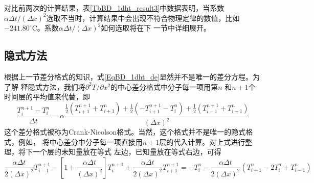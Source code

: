 对比前两次的计算结果，表\ref{TbBD_1dht_result3}中数据表明，当系数$\alpha\Delta t/(\Delta
x)^{2}$选取不当时，计算结果中会出现不符合物理定律的数值，比如
$-241.80^{\circ}\!\mathrm{C}$。系数$\alpha\Delta t/(\Delta x)^{2}$如何选取将在下
一节中详细展开。

\subsection{隐式方法}
根据上一节差分格式的知识，式\eqref{EqBD_1dht_de}显然并不是唯一的差分方程。为了解
释隐式方法，我们将$\partial^{2}T/\partial x^{2}$的中心差分格式中分子每一项用第$n$
和$n+1$个时间层的平均值来代替，即
\begin{equation}
  \frac{T_{i}^{n+1}-T_{i}^{n}}{\Delta t}
  =
  \alpha
  \frac{
    \frac{1}{2}(T_{i+1}^{n+1}+T_{i+1}^{n}) +
    \frac{1}{2}(-T_{i+1}^{n+1}-T_{i}^{n}) +
    \frac{1}{2}(T_{i-1}^{n+1}+T_{i-1}^{n}) 
  }{(\Delta x)^{2}}
\end{equation}
这个差分格式被称为Crank-Nicolson格式。当然，这个格式并不是唯一的隐式格式，例如，
将中心差分中分子每一项直接用$n+1$层的代入计算。对上式进行整理，将下一个层的未知量放在等式
左边，已知量放在等式右边，可得
\begin{equation}
  \frac{\alpha\Delta t}{2(\Delta x)^{2}}
  T_{i-1}^{n+1} 
  -
  \left[1+\frac{\alpha\Delta t}{(\Delta x)^{2}}\right]
  T_{i}^{n+1} 
  +
  \frac{\alpha\Delta t}{2(\Delta x)^{2}}
  T_{i+1}^{n+1} 
  =
  -T_{i}^{n}
  -
  \frac{\alpha\Delta t}{2(\Delta x)^{2}}
  (T_{i+1}^{n} - 2T_{i}^{n} + T_{i-1}^{n})
  \label{EqBD_1dht_cr_2}
\end{equation}

